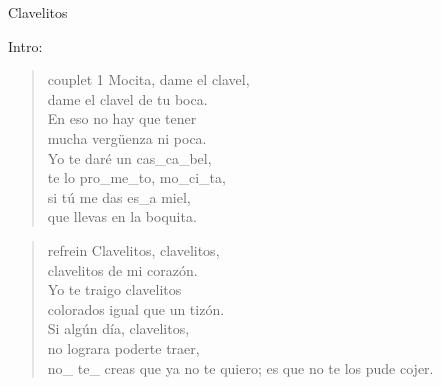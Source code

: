 \begin{song}[vals]{Clavelitos}
\begin{instrumental}{Intro:}
\end{instrumental}

\begin{verse}{couplet 1}
Mocita, dame el clavel,\\
dame el clavel de tu boca.\\
En eso no hay que tener\\
mucha vergüenza ni poca. \hspace{1em} \hspace{1em} \hspace{1em}\\
Yo te daré un cas\_ca\_bel,\\
\hspace{1em} te lo pro\_me\_to, mo\_ci\_ta, \hspace{1em} \hspace{1em} \hspace{1em}\\
si t\'u me das es\_a miel,\\
que llevas en la boquita.
\end{verse}


\begin{verse}{refrein}
Clavelitos, clavelitos,\\
clavelitos de mi corazón.\\
Yo te traigo clavelitos\\
colorados igual que un tizón.\\
Si algún día, clavelitos,\\
no lograra poderte traer,\\
no\_ te\_ creas que ya no te quiero;
es que no te los pude cojer. \hspace{1em} \hspace{1em}
\end{verse}


\end{song}
